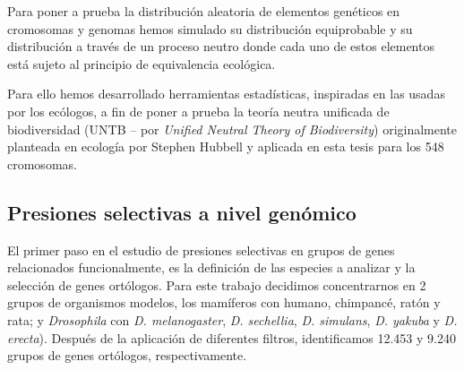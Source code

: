 Para poner a prueba la distribución aleatoria de elementos genéticos en cromosomas y genomas hemos simulado su distribución equiprobable y su distribución a través de un proceso neutro donde cada uno de estos elementos está sujeto al principio de equivalencia ecológica.

Para ello hemos desarrollado herramientas estadísticas, inspiradas en las usadas por los ecólogos, a fin de poner a prueba la teoría neutra unificada de biodiversidad (UNTB -- por \textit{Unified Neutral Theory of Biodiversity}) originalmente planteada en ecología por Stephen Hubbell y aplicada en esta tesis para los 548 cromosomas.




\subsection*{Presiones selectivas a nivel genómico}

El primer paso en el estudio de presiones selectivas en grupos de genes relacionados funcionalmente, es la definición de las especies a analizar y la selección de genes ortólogos. Para este trabajo decidimos concentrarnos en 2 grupos de organismos modelos, los mamíferos con humano, chimpancé, ratón y rata; y \textit{Drosophila} con \textit{D. melanogaster}, \textit{D. sechellia}, \textit{D. simulans}, \textit{D. yakuba} y \textit{D. erecta}). Después de la aplicación de diferentes filtros, identificamos 12.453 y 9.240 grupos de genes ortólogos, respectivamente.


